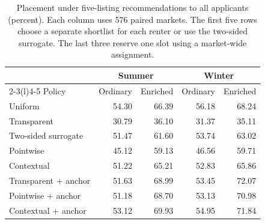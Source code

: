 \begin{table}[t]\centering\small
\caption{Placement under five-listing recommendations to all applicants (percent). Each column uses 576 paired markets. The first five rows choose a separate shortlist for each renter or use the two-sided surrogate. The last three reserve one slot using a market-wide assignment.}
\label{tab:ai}
\begin{tabular}{@{}lrrrr@{}}\toprule
 & \multicolumn{2}{c}{Summer} & \multicolumn{2}{c}{Winter} \\
\cmidrule(lr){2-3}\cmidrule(l){4-5}
Policy & Ordinary & Enriched & Ordinary & Enriched \\\midrule
Uniform & 54.30 & 66.39 & 56.18 & 68.24 \\
Transparent & 30.79 & 36.10 & 31.37 & 35.11 \\
Two-sided surrogate & 51.47 & 61.60 & 53.74 & 63.02 \\
Pointwise & 45.12 & 59.13 & 46.56 & 59.71 \\
Contextual & 51.22 & 65.21 & 52.83 & 65.86 \\
\midrule
Transparent + anchor & 51.63 & 68.99 & 53.45 & 72.07 \\
Pointwise + anchor & 51.18 & 68.70 & 53.13 & 70.98 \\
Contextual + anchor & 53.12 & 69.93 & 54.95 & 71.84 \\
\bottomrule\end{tabular}\end{table}
